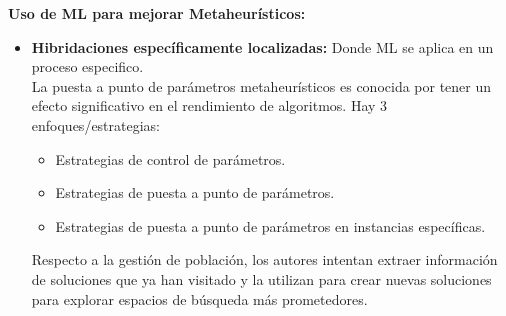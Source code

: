 \documentclass[11pt]{article} %
\begin{document}
\textbf{Uso de ML para mejorar Metaheurísticos:}

\begin{itemize}
\item \textbf{Hibridaciones específicamente localizadas:} Donde ML se aplica en un proceso especifico.\\[0.2cm]
La puesta a punto de parámetros metaheurísticos es conocida por tener un efecto significativo en el rendimiento de algoritmos. Hay 3 enfoques/estrategias:
\begin{itemize}
\item Estrategias de control de parámetros.
\item Estrategias de puesta a punto de parámetros.
\item Estrategias de puesta a punto de parámetros en instancias específicas.
\end{itemize}
Respecto a la gestión de población, los autores intentan extraer información de soluciones que ya han visitado y la utilizan para crear nuevas soluciones para explorar espacios de búsqueda más prometedores.\\


\end{itemize}
\end{document}
